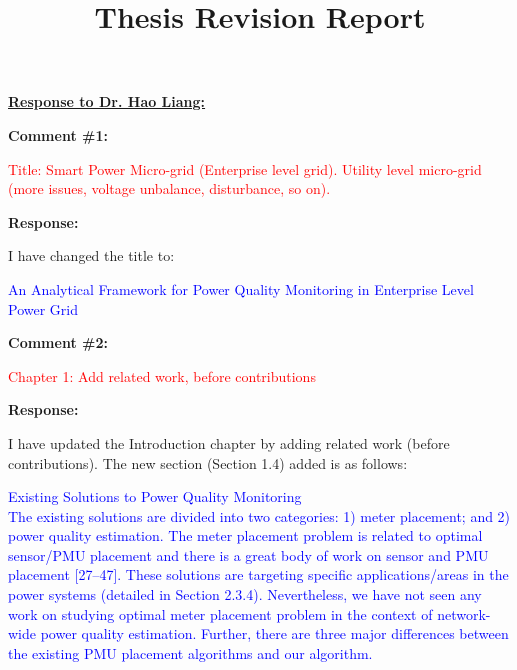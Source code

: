 \documentclass[journal]{IEEEtran}
\begin{document}
\title{Thesis Revision Report}
\maketitle

 \Large
\noindent \textbf{\underline{Response to Dr. Hao Liang:}}
 \large

\vspace{10pt}
\textbf{Comment \#1:}
\begin{adjustwidth}{2.5em}{0pt}
\singlespacing \vspace{-10pt}
\textcolor{red}{Title: Smart Power Micro-grid (Enterprise level grid). Utility level micro-grid (more issues, voltage unbalance, disturbance, so on).}
\end{adjustwidth}

\vspace{5pt}
\textbf{Response:}
\begin{adjustwidth}{2.5em}{0pt}
I have changed the title to:

\vspace{5pt}
\noindent\textcolor{blue}{An Analytical Framework for Power Quality Monitoring in Enterprise Level Power Grid}
\end{adjustwidth}
 
 
 
\vspace{30pt}
\textbf{Comment \#2:}
\begin{adjustwidth}{2.5em}{0pt}
\singlespacing \vspace{-10pt}
\textcolor{red}{Chapter 1: Add related work, before contributions}
\end{adjustwidth}

\vspace{5pt}
\textbf{Response:}
\begin{adjustwidth}{2.5em}{0pt}
I have updated the Introduction chapter by adding related work (before contributions). The new section (Section 1.4) added is as follows:
\end{adjustwidth}

\vspace{5pt}
\begin{adjustwidth}{2.5em}{0pt}
\noindent\textcolor{blue}{{\Large Existing Solutions to Power Quality Monitoring} \vspace{0.4em} \\
The existing solutions are divided into two categories: 1) meter placement; and 2) power quality estimation. The meter placement problem is related to optimal sensor/PMU placement and there is a great body of work on sensor and PMU placement [27--47]. These solutions are targeting specific applications/areas in the power systems (detailed in Section 2.3.4). Nevertheless, we have not seen any work on studying optimal meter placement problem in the context of network-wide power quality estimation. Further, there are three major differences between the existing PMU placement algorithms and our algorithm.}\end{adjustwidth}
\end{document}
